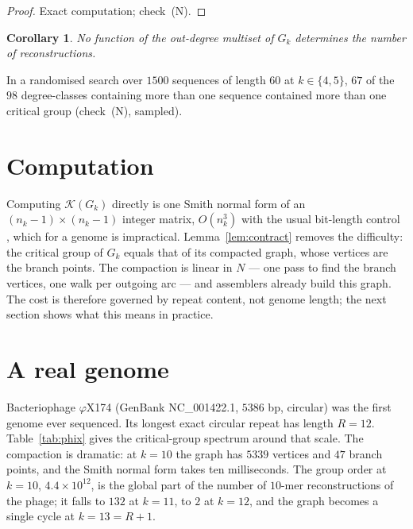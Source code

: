 \documentclass[11pt]{article}
\theoremstyle{plain}
\newtheorem{corollary}[theorem]{Corollary}
\theoremstyle{definition}
\theoremstyle{remark}
\newcommand{\K}{\mathcal{K}}
\begin{document}
\begin{proof}
Exact computation; check~(N).
\end{proof}

\begin{corollary}\label{cor:insufficient}
No function of the out-degree multiset of $G_k$ determines the number of reconstructions.
\end{corollary}

In a randomised search over $1500$ sequences of length $60$ at $k\in\{4,5\}$, $67$ of the
$98$ degree-classes containing more than one sequence contained more than one critical
group (check~(N), sampled).

\section{Computation}\label{sec:compute}

Computing $\K(G_k)$ directly is one Smith normal form of an $(n_k-1)\times(n_k-1)$ integer
matrix, $O(n_k^{3})$ with the usual bit-length control \cite[I]{ANCFT}, which for a genome
is impractical. Lemma~\ref{lem:contract} removes the difficulty: the critical group of $G_k$
equals that of its compacted graph, whose vertices are the branch points. The compaction is
linear in $N$ --- one pass to find the branch vertices, one walk per outgoing arc --- and
assemblers already build this graph. The cost is therefore governed by repeat content, not
genome length; the next section shows what this means in practice.

\section{A real genome}\label{sec:real}

Bacteriophage $\varphi$X174 (GenBank NC\_001422.1, $5386$ bp, circular) was the first
genome ever sequenced. Its longest exact circular repeat has length $R=12$.
Table~\ref{tab:phix} gives the critical-group spectrum around that scale. The compaction
is dramatic: at $k=10$ the graph has $5339$ vertices and $47$ branch points, and the Smith
normal form takes ten milliseconds. The group order at $k=10$, $4.4\times10^{12}$, is the
global part of the number of $10$-mer reconstructions of the phage; it falls to $132$ at
$k=11$, to $2$ at $k=12$, and the graph becomes a single cycle at $k=13=R+1$.
\end{document}

